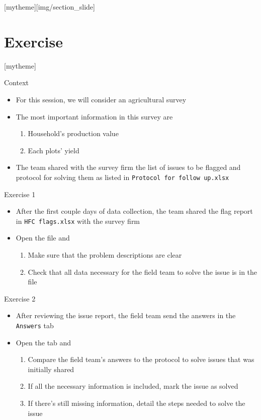 \documentclass[aspectratio=169]{beamer}
\newcommand{\sectionpic}[2]{
	\setbeamertemplate{section page}[mytheme][#2]
	\section{#1}
	\setbeamertemplate{section page}[mytheme]
}
\begin{document}
\sectionpic{Exercise}{img/section_slide}

\begin{frame}{Context}
	\begin{itemize}
		\item For this session, we will consider an agricultural survey
		\item The most important information in this survey are 
		\begin{enumerate}
			\item Household's production value
			\item Each plots' yield
		\end{enumerate}
		\item The team shared with the survey firm the list of issues to be flagged and protocol for solving them as listed in \texttt{Protocol for follow up.xlsx}
	\end{itemize}
\end{frame}

\begin{frame}{Exercise 1}
	\begin{itemize}
		\item After the first couple days of data collection, the team shared the flag report in \texttt{HFC flags.xlsx} with the survey firm
		\item Open the file and
		\begin{enumerate}
			\item Make sure that the problem descriptions are clear
			\item Check that all data necessary for the field team to solve the issue is in the file
		\end{enumerate}
	\end{itemize}
\end{frame}


\begin{frame}{Exercise 2}
	\begin{itemize}
		\item After reviewing the issue report, the field team send the answers in the \texttt{Answers} tab
		\item Open the tab and
		\begin{enumerate}
			\item Compare the field team's answers to the protocol to solve issues that was initially shared
			\item If all the necessary information is included, mark the issue as solved
			\item If there's still missing information, detail the steps needed to solve the issue
		\end{enumerate}
	\end{itemize}
\end{frame}
\end{document}
